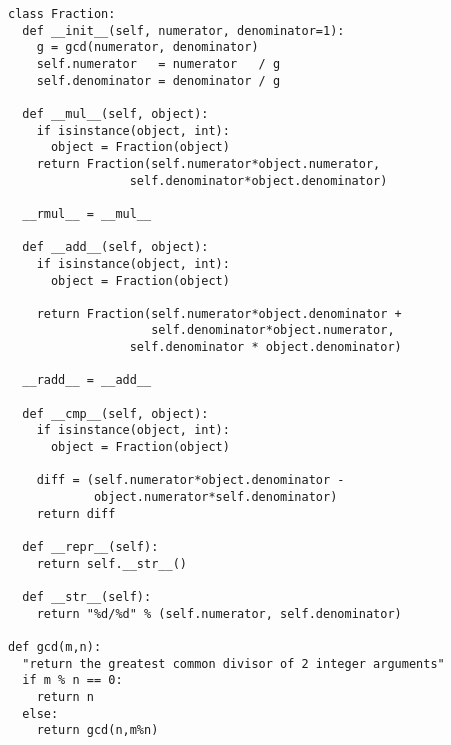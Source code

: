 \beforeverb
\begin{verbatim}
class Fraction:
  def __init__(self, numerator, denominator=1):
    g = gcd(numerator, denominator)
    self.numerator   = numerator   / g
    self.denominator = denominator / g

  def __mul__(self, object):
    if isinstance(object, int):
      object = Fraction(object)
    return Fraction(self.numerator*object.numerator,
                 self.denominator*object.denominator)

  __rmul__ = __mul__

  def __add__(self, object):
    if isinstance(object, int):
      object = Fraction(object)

    return Fraction(self.numerator*object.denominator +
                    self.denominator*object.numerator,
                 self.denominator * object.denominator)

  __radd__ = __add__

  def __cmp__(self, object):
    if isinstance(object, int):
      object = Fraction(object)

    diff = (self.numerator*object.denominator -
            object.numerator*self.denominator)
    return diff

  def __repr__(self):
    return self.__str__()

  def __str__(self):
    return "%d/%d" % (self.numerator, self.denominator)

def gcd(m,n):
  "return the greatest common divisor of 2 integer arguments"
  if m % n == 0:
    return n
  else:
    return gcd(n,m%n)

\end{verbatim}
\afterverb
